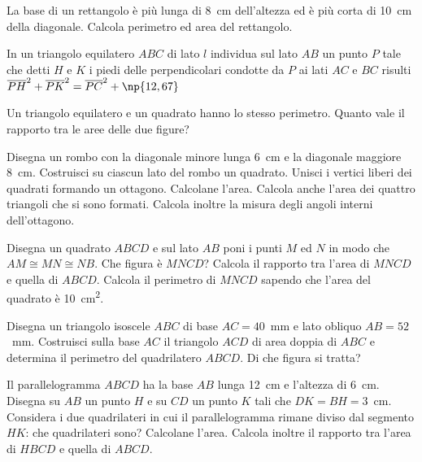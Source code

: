 \begin{multicols}{2}
\begin{esercizio}
\label{ese:7.38}
La base di un rettangolo è più lunga di 8~cm dell'altezza ed è più 
corta di 10~cm della diagonale. Calcola perimetro ed area del 
rettangolo. 			
\end{esercizio}

\begin{esercizio}
\label{ese:7.39}
In un triangolo equilatero $ABC$ di lato $l$ individua sul lato $AB$ 
un punto $P$ tale che detti $H$ e $K$ i piedi delle perpendicolari 
condotte da $P$ ai lati $AC$ e $BC$ risulti 
$\overline{PH}^2+\overline{PK}^2=\overline{PC}^2+\np{12,67}$
\end{esercizio}

\begin{esercizio}
\label{ese:7.40}
Un triangolo equilatero e un quadrato hanno lo stesso perimetro. 
Quanto vale il rapporto tra le aree delle due figure?
\end{esercizio}

\begin{esercizio}
\label{ese:7.43}
Disegna un rombo con la diagonale minore lunga 6~cm e la diagonale 
maggiore 8~cm. Costruisci su ciascun lato del rombo un quadrato. 
Unisci i vertici liberi dei quadrati formando un ottagono. Calcolane 
l'area. Calcola anche l'area dei quattro triangoli che si sono 
formati. Calcola inoltre la misura degli angoli interni dell'ottagono.
\end{esercizio}

\begin{esercizio}
\label{ese:7.44}
Disegna un quadrato $ABCD$ e sul lato $AB$ poni i punti $M$ ed $N$ in 
modo che $AM\cong MN\cong NB$. Che figura è $MNCD$? Calcola il 
rapporto tra l'area di $MNCD$ e quella di $ABCD$. Calcola il 
perimetro di $MNCD$ sapendo che l'area del quadrato è 
10~cm\textsuperscript{2}.
\end{esercizio}

\begin{esercizio}
\label{ese:7.45}
Disegna un triangolo isoscele $ABC$ di base $AC=40$~mm e lato obliquo 
$AB=52$~mm. Costruisci sulla base $AC$ il triangolo $ACD$ di area 
doppia di $ABC$ e determina il perimetro del quadrilatero $ABCD$. Di 
che figura si tratta?
\end{esercizio}

\begin{esercizio}
\label{ese:7.46}
Il parallelogramma $ABCD$ ha la base $AB$ lunga 12~cm e l'altezza di 
6~cm. Disegna su $AB$ un punto $H$ e su $CD$ un punto $K$ tali che 
$DK=BH=3$~cm. Considera i due quadrilateri in cui il parallelogramma 
rimane diviso dal segmento $HK$: che quadrilateri sono? Calcolane 
l'area. Calcola inoltre il rapporto tra l'area di $HBCD$ e quella di 
$ABCD$.
\end{esercizio}


\end{multicols}
